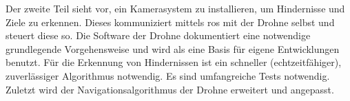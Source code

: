 Der zweite Teil sieht vor, ein Kamerasystem zu installieren, um Hindernisse und Ziele zu erkennen. Dieses kommuniziert mittels \acrshort{ros} mit der Drohne selbst und steuert diese so. Die Software der Drohne dokumentiert eine notwendige grundlegende Vorgehensweise und wird als eine Basis für eigene Entwicklungen benutzt.\newline
Für die Erkennung von Hindernissen ist ein schneller (echtzeitfähiger), zuverlässiger Algorithmus notwendig. Es sind umfangreiche Tests notwendig.\newline
Zuletzt wird der Navigationsalgorithmus der Drohne erweitert und angepasst.

